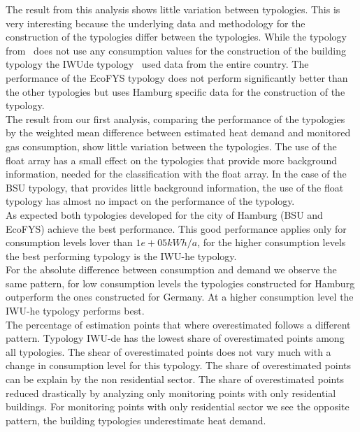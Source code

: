 \documentclass[authoryear,preprint,review,12pt]{elsarticle}
\begin{document}
\begin{linenumbers}
The result from this analysis shows little variation between typologies. This
is very interesting because the underlying data and methodology for the
construction of the typologies differ between the typologies. While the
typology from~\cite{Blesl.2002} does not use any consumption values for the
construction of the building typology the IWUde typology~\cite{IWU.2003} used
data from the entire country. The performance of the EcoFYS typology does not
perform significantly better than the other typologies but uses Hamburg
specific data for the construction of the typology.\\

The result from our first analysis, comparing the performance of the typologies
by the weighted mean difference between estimated heat demand and monitored gas
consumption, show little variation between the typologies. The use of the float
array has a small effect on the typologies that provide more background
information, needed for the classification with the float array. In the case of
the BSU typology, that provides little background information, the use of the
float typology has almost no impact on the performance of the typology.\\

As expected both typologies developed for the city of Hamburg (BSU and EcoFYS)
achieve the best performance. This good performance applies only for
consumption levels lover than $1e+05 kWh/a$, for the higher consumption levels
the best performing typology is the IWU-he typology.\\ 

For the absolute difference between consumption and demand we observe the same
pattern, for low consumption levels the typologies constructed for Hamburg
outperform the ones constructed for Germany. At a higher consumption level the
IWU-he typology performs best.\\

The percentage of estimation points that where overestimated follows a
different pattern. Typology IWU-de has the lowest share of overestimated points
among all typologies. The shear of overestimated points does not vary much with
a change in consumption level for this typology.
The share of overestimated points can be explain by the non residential sector.
The share of overestimated points reduced drastically by analyzing only
monitoring points with only residential buildings. For monitoring points with
only residential sector we see the opposite pattern, the building typologies
underestimate heat demand.\\


\end{linenumbers}
\end{document}
